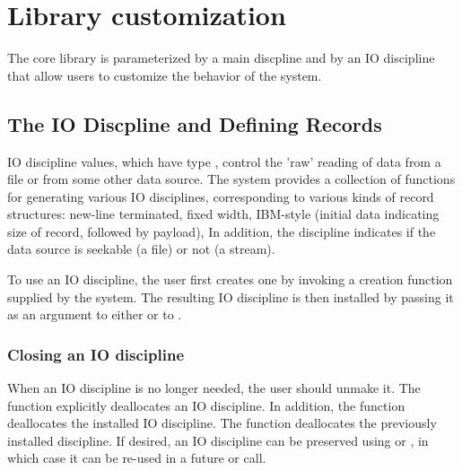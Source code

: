 \chapter{Library customization}
\label{chap:library-customization}
The \pads{} core library is parameterized by a main discpline and by
an IO discipline that allow users to customize the behavior of the
system.


\section{The IO Discpline and Defining Records}
IO discipline values, which have type , control the
'raw' reading of data from a file or from some other data source.  
The \pads{} system provides a collection of functions for generating
various IO disciplines, corresponding to various kinds of record
structures: new-line terminated, fixed width, IBM-style (initial data
indicating size of record, followed by payload), \etc{}  In addition,
the discipline indicates if the data source is seekable (a file) or
not (a stream).

To use an IO discipline, the user first creates one by invoking
a creation function supplied by the \pads{} system.  The resulting IO
discipline is then installed by passing it as an argument to either
 or to .

\subsection{Closing an IO discipline}
When an IO discipline is no longer needed, the user should unmake it.
The function  explicitly deallocates an IO
discipline. In addition, the function 
deallocates the installed IO discipline.  
The function  deallocates the previously
installed discipline.
If desired, an IO discipline can be preserved using
 or , in
which case it can be re-used in a future  or
 call. 

